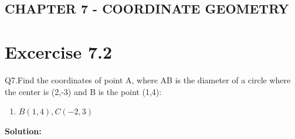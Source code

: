 \documentclass[12pt]{article}
\providecommand{\brak}[1]{\ensuremath{\left(#1\right)}}
\newcommand{\solution}{\noindent \textbf{Solution: }}
\begin{document}
\begin{center}
\section*{CHAPTER 7 - COORDINATE GEOMETRY}

\end{center}
\section*{Excercise 7.2}

Q7.Find the coordinates of point A, where AB is the diameter of a circle where the center is (2,-3) and B is the point (1,4):
\begin{enumerate}
	\item $B\brak{1,4}, C\brak{-2,3}$
\end{enumerate}
\solution
\end{document}
